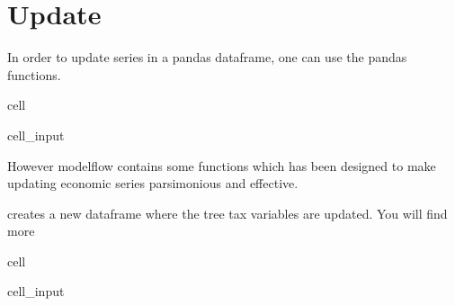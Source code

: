 \documentclass[letterpaper,10pt,english]{jupyterBook}
\begin{document}
\chapter{Update}
\label{\detokenize{content/howto/experiments/create_experiment:update}}
\sphinxAtStartPar
In order to update series in a pandas dataframe, one can use the pandas functions.

\begin{sphinxuseclass}{cell}\begin{sphinxVerbatimInput}

\begin{sphinxuseclass}{cell_input}
\begin{sphinxVerbatim}[commandchars=\\\{\}]
  
\PYG{p}{[}\PYG{p}{[} \PYG{p}{]}\PYG{p}{]}   
\end{sphinxVerbatim}

\end{sphinxuseclass}\end{sphinxVerbatimInput}

\end{sphinxuseclass}
\sphinxAtStartPar
However modelflow contains some functions which has been designed to make updating economic series parsimonious and effective.

\sphinxAtStartPar
{} creates a new dataframe where the tree tax variables are updated. You will find more {\hyperref[\detokenize{content/howto/update/model update::doc}]{}}

\begin{sphinxuseclass}{cell}\begin{sphinxVerbatimInput}

\begin{sphinxuseclass}{cell_input}
\begin{sphinxVerbatim}[commandchars=\\\{\}]
    
\end{sphinxVerbatim}

\end{sphinxuseclass}\end{sphinxVerbatimInput}

\end{sphinxuseclass}
\end{document}
